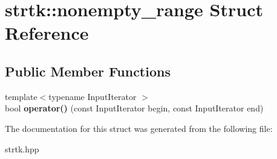 \hypertarget{structstrtk_1_1nonempty__range}{\section{strtk\-:\-:nonempty\-\_\-range Struct Reference}
\label{structstrtk_1_1nonempty__range}
}
\subsection*{Public Member Functions}
\begin{DoxyCompactItemize}
\item 
\hypertarget{structstrtk_1_1nonempty__range_ad469236b6d5583d3acc92a6a297b0eb8}{{\footnotesize template$<$typename Input\-Iterator $>$ }\\bool {\bfseries operator()} (const Input\-Iterator begin, const Input\-Iterator end)}\label{structstrtk_1_1nonempty__range_ad469236b6d5583d3acc92a6a297b0eb8}

\end{DoxyCompactItemize}


The documentation for this struct was generated from the following file\-:\begin{DoxyCompactItemize}
\item 
strtk.\-hpp\end{DoxyCompactItemize}
